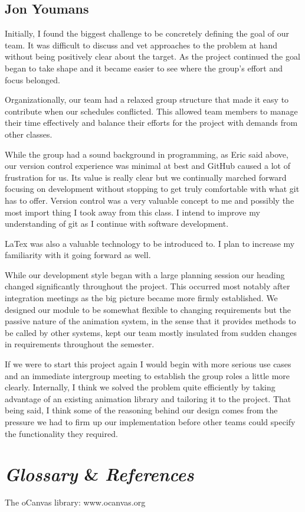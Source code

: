 \documentclass[12pt]{article}
\begin{document}
\subsection{Jon Youmans}
\begin{changemargin}{1cm}{0cm} 

Initially, I found the biggest challenge to be concretely defining the goal of our team. It was difficult to discuss and vet approaches to the problem at hand without being positively clear about the target. As the project continued the goal began to take shape and it became easier to see where the group's effort and focus belonged.

Organizationally, our team had a relaxed group structure that made it easy to contribute when our schedules conflicted. This allowed team members to manage their time effectively and balance their efforts for the project with demands from other classes.

While the group had a sound background in programming, as Eric said above, our version control experience was minimal at best and GitHub caused a lot of frustration for us. Its value is really clear but we continually marched forward focusing on development without stopping to get truly comfortable with what git has to offer. Version control was a very valuable concept to me and possibly the most import thing I took away from this class. I intend to improve my understanding of git as I continue with software development.

LaTex was also a valuable technology to be introduced to. I plan to increase my familiarity with it going forward as well.
    
While our development style began with a large planning session our heading changed significantly throughout the project. This occurred most notably after integration meetings as the big picture became more firmly established. We designed our module to be somewhat flexible to changing requirements but the passive nature of the animation system, in the sense that it provides methods to be called by other systems, kept our team mostly insulated from sudden changes in requirements throughout the semester.
    
If we were to start this project again I would begin with more serious use cases and an immediate intergroup meeting to establish the group roles a little more clearly. Internally, I think we solved the problem quite efficiently by taking advantage of an existing animation library and tailoring it to the project. That being said, I think some of the reasoning behind our design comes from the pressure we had to firm up our implementation before other teams could specify the functionality they required. 

\end{changemargin} 


\section{\emph{\Large Glossary} \Large  \& \emph{\Large References}}

The oCanvas library: www.ocanvas.org
	
\end{document}
